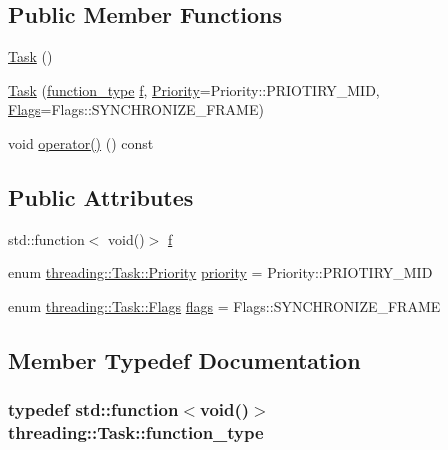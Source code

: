 \subsection*{Public Member Functions}
\begin{DoxyCompactItemize}
\item 
\hyperlink{classthreading_1_1Task_aff055842f22c754989e54fc0079cdc51}{Task} ()
\item 
\hyperlink{classthreading_1_1Task_ab3d24517a2952d42b2f1d4a782972c5c}{Task} (\hyperlink{classthreading_1_1Task_a3ea6eaa0c40c022d11aba7b852729ffe}{function\-\_\-type} \hyperlink{classthreading_1_1Task_a3124f087b332f0d041d17c4656a4562a}{f}, \hyperlink{classthreading_1_1Task_a0c239195601479ba244066b363d633a0}{Priority}=Priority\-::\-P\-R\-I\-O\-T\-I\-R\-Y\-\_\-\-M\-I\-D, \hyperlink{classthreading_1_1Task_a06b9fed2b0053a677b772b77a2932664}{Flags}=Flags\-::\-S\-Y\-N\-C\-H\-R\-O\-N\-I\-Z\-E\-\_\-\-F\-R\-A\-M\-E)
\item 
void \hyperlink{classthreading_1_1Task_a17e42c85ec8d73da41b9ad059fdf46d4}{operator()} () const 
\end{DoxyCompactItemize}
\subsection*{Public Attributes}
\begin{DoxyCompactItemize}
\item 
std\-::function$<$ void()$>$ \hyperlink{classthreading_1_1Task_a3124f087b332f0d041d17c4656a4562a}{f}
\item 
enum \hyperlink{classthreading_1_1Task_a0c239195601479ba244066b363d633a0}{threading\-::\-Task\-::\-Priority} \hyperlink{classthreading_1_1Task_a0195384291445a4d3ddab43d125efcc6}{priority} = Priority\-::\-P\-R\-I\-O\-T\-I\-R\-Y\-\_\-\-M\-I\-D
\item 
enum \hyperlink{classthreading_1_1Task_a06b9fed2b0053a677b772b77a2932664}{threading\-::\-Task\-::\-Flags} \hyperlink{classthreading_1_1Task_aaa114552c0b8f31aba9eda8d49ec3f83}{flags} = Flags\-::\-S\-Y\-N\-C\-H\-R\-O\-N\-I\-Z\-E\-\_\-\-F\-R\-A\-M\-E
\end{DoxyCompactItemize}


\subsection{Member Typedef Documentation}
\hypertarget{classthreading_1_1Task_a3ea6eaa0c40c022d11aba7b852729ffe}{
\subsubsection[{function\-\_\-type}]{\setlength{\rightskip}{0pt plus 5cm}typedef std\-::function$<$void()$>$ {\bf threading\-::\-Task\-::function\-\_\-type}}}\label{classthreading_1_1Task_a3ea6eaa0c40c022d11aba7b852729ffe}


